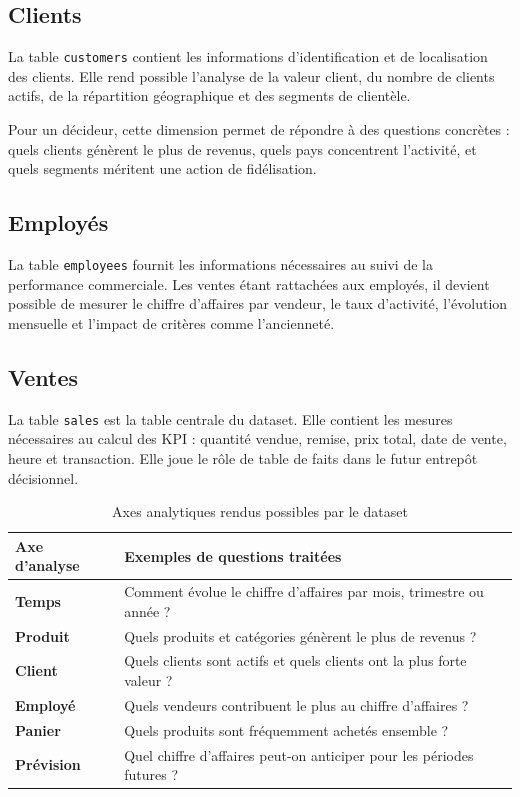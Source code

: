 \documentclass[12pt,a4paper,twoside]{report}
\begin{document}
\subsection{Clients}

La table \texttt{customers} contient les informations d'identification et de localisation des clients. Elle rend possible l'analyse de la valeur client, du nombre de clients actifs, de la répartition géographique et des segments de clientèle.

Pour un décideur, cette dimension permet de répondre à des questions concrètes : quels clients génèrent le plus de revenus, quels pays concentrent l'activité, et quels segments méritent une action de fidélisation.

\subsection{Employés}

La table \texttt{employees} fournit les informations nécessaires au suivi de la performance commerciale. Les ventes étant rattachées aux employés, il devient possible de mesurer le chiffre d'affaires par vendeur, le taux d'activité, l'évolution mensuelle et l'impact de critères comme l'ancienneté.

\subsection{Ventes}

La table \texttt{sales} est la table centrale du dataset. Elle contient les mesures nécessaires au calcul des KPI : quantité vendue, remise, prix total, date de vente, heure et transaction. Elle joue le rôle de table de faits dans le futur entrepôt décisionnel.

\begin{table}[H]
\centering
{}
\begin{tabularx}{\textwidth}{>{\bfseries}p{3.3cm}X}
\toprule
\rowcolor{TableHeader}
\color{white}Axe d'analyse & \color{white}Exemples de questions traitées \\
\midrule
Temps & Comment évolue le chiffre d'affaires par mois, trimestre ou année ? \\
Produit & Quels produits et catégories génèrent le plus de revenus ? \\
Client & Quels clients sont actifs et quels clients ont la plus forte valeur ? \\
Employé & Quels vendeurs contribuent le plus au chiffre d'affaires ? \\
Panier & Quels produits sont fréquemment achetés ensemble ? \\
Prévision & Quel chiffre d'affaires peut-on anticiper pour les périodes futures ? \\
\bottomrule
\end{tabularx}
\caption{Axes analytiques rendus possibles par le dataset}
\end{table}
\end{document}
